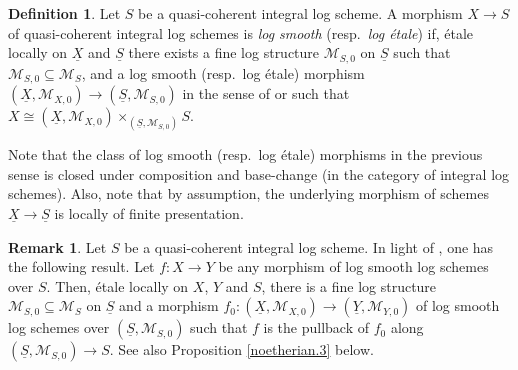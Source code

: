 \documentclass[11pt, a4paper]{amsart}
\theoremstyle{definition}
\newtheorem{df}[thm]{Definition}
\newtheorem{rmk}[thm]{Remark}
\numberwithin{equation}{subsection}
\begin{document}
\begin{df} \label{def:logsmooth}
Let $S$ be a  quasi-coherent integral log scheme. A morphism $X\to S$ of quasi-coherent integral log schemes is \emph{log smooth} (resp.\ \emph{log \'etale}) if, \'etale locally on $\underline{X}$ and $\underline{S}$ there exists a fine log structure  $\mathcal{M}_{S, 0}$ on $\underline{S}$ such that $\mathcal{M}_{S,0} \subseteq \mathcal{M}_S$, and a log smooth (resp.\ log \'etale) morphism $(\underline{X}, \mathcal{M}_{X,0}) \to (\underline{S}, \mathcal{M}_{S,0})$ in the sense of \cite[Definition IV.3.1.1]{Ogu} or \cite[\S 3.3]{KatoLog} such that $X \cong (\underline{X}, \mathcal{M}_{X,0}) \times_{(\underline{S}, \mathcal{M}_{S,0})} S$.  


Note that the class of log smooth (resp.\ log \'etale) morphisms in the previous sense is closed under composition and base-change (in the category of integral log schemes). Also, note that by assumption, the underlying morphism of schemes $\underline{X}\to \underline{S}$ is locally of finite presentation. 
\end{df}
\begin{rmk} Let $S$ be a quasi-coherent integral log scheme. 
    In light of \cite[Proposition 2.4]{BKV}, one has the following result. Let $f\colon X\to Y$ be any morphism of log smooth log schemes over $S$. Then, \'etale locally on $X$, $Y$ and $S$, there is a fine log structure $\mathcal{M}_{S,0} \subseteq \mathcal{M}_{S}$ on $\underline{S}$ and a morphism $f_0\colon (\underline{X}, \mathcal{M}_{X,0})\to (\underline{Y}, \mathcal{M}_{Y,0})$ of log smooth log schemes over $(\underline{S}, \mathcal{M}_{S,0})$ such that $f$ is the pullback of $f_0$ along $(\underline{S}, \mathcal{M}_{S,0}) \to S$.  See also Proposition \ref{noetherian.3} below.
\end{rmk}
\end{document}
